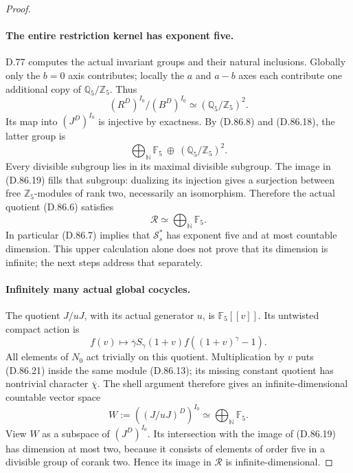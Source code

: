 \begin{proof}
\paragraph{The entire restriction kernel has exponent five.}
D.77 computes the actual invariant groups and their natural
inclusions. Globally only the \(b=0\) axis contributes; locally
the \(a\) and \(a-b\) axes each contribute one additional
copy of \(\mathbb Q_5/\mathbb Z_5\). Thus
\[
 (R^D)^{I_0}/(B^D)^{I_0}
                  \simeq(\mathbb Q_5/\mathbb Z_5)^2.   \tag{D.86.19}
\]
Its map into \((J^D)^{I_0}\) is injective by exactness.
By (D.86.8) and (D.86.18), the latter group is
\[
             \bigoplus_{\mathbb N}\mathbb F_5
                         \ \oplus\
                     (\mathbb Q_5/\mathbb Z_5)^2.
\]
Every divisible subgroup lies in its maximal divisible
subgroup. The image in (D.86.19) fills that subgroup:
dualizing its injection gives a surjection between free
\(\mathbb Z_5\)-modules of rank two, necessarily an
isomorphism. Therefore the actual quotient (D.86.6) satisfies
\[
                    \mathcal R\simeq
                         \bigoplus_{\mathbb N}\mathbb F_5.
                                                               \tag{D.86.20}
\]
In particular (D.86.7) implies that \(\mathcal S_s^*\)
has exponent five and at most countable dimension. This
upper calculation alone does not prove that its dimension
is infinite; the next steps address that separately.

\paragraph{Infinitely many actual global cocycles.}
The quotient \(J/uJ\), with its actual generator \(u\), is
\(\mathbb F_5[[v]]\). Its untwisted compact action is
\[
 f(v)\longmapsto
       \overline\gamma S_\gamma(1+v)
                      f((1+v)^\gamma-1).              \tag{D.86.21}
\]
All elements of \(N_0\) act trivially on this quotient.
Multiplication by \(v\) puts (D.86.21) inside the same
module (D.86.13); its missing constant quotient has
nontrivial character \(\overline\chi\). The shell argument
therefore gives an infinite-dimensional countable vector space
\[
 W:=((J/uJ)^D)^{I_0}\simeq\bigoplus_{\mathbb N}\mathbb F_5.
                                                               \tag{D.86.22}
\]
View \(W\) as a subspace of \((J^D)^{I_0}\).
Its intersection with the image of (D.86.19) has dimension
at most two, because it consists of elements of order five
in a divisible group of corank two. Hence its image in
\(\mathcal R\) is infinite-dimensional.


\end{proof}

